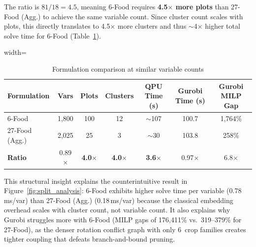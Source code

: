 \documentclass{oqireport}
\begin{document}
\noindent The ratio is $81/18 = 4.5$, meaning 6-Food requires \textbf{4.5$\times$ more plots} than 27-Food (Agg.) to achieve the same variable count. Since cluster count scales with plots, this directly translates to 4.5$\times$ more clusters and thus $\sim$4$\times$ higher total solve time for 6-Food (Table~\ref{tab:formulation_comparison}).

\begin{table}[H]
\centering
\caption{Formulation comparison at similar variable counts}
\label{tab:formulation_comparison}
\small
\begin{adjustbox}{width=\textwidth}
\begin{tabular}{lcccccc}
\toprule
\textbf{Formulation} & \textbf{Vars} & \textbf{Plots} & \textbf{Clusters} & \textbf{QPU Time (s)} & \textbf{Gurobi Time (s)} & \textbf{Gurobi MILP Gap} \\
\midrule
6-Food & 1,800 & 100 & 12 & $\sim$107 & 100.7 & 1,764\% \\
27-Food (Agg.) & 2,025 & 25 & 3 & $\sim$30 & 103.8 & 258\% \\
\midrule
\textbf{Ratio} & 0.89$\times$ & \textbf{4.0$\times$} & \textbf{4.0$\times$} & \textbf{3.6$\times$} & 0.97$\times$ & 6.8$\times$ \\
\bottomrule
\end{tabular}
\end{adjustbox}
\end{table}

This structural insight explains the counterintuitive result in Figure~\ref{fig:split_analysis}: 6-Food exhibits higher solve time per variable (0.78\,ms/var) than 27-Food (Agg.) (0.18\,ms/var) because the classical embedding overhead scales with cluster count, not variable count. It also explains why Gurobi struggles more with 6-Food (MILP gaps of 176,411\% vs.\ 319--379\% for 27-Food), as the denser rotation conflict graph with only 6~crop families creates tighter coupling that defeats branch-and-bound pruning.




\end{document}
